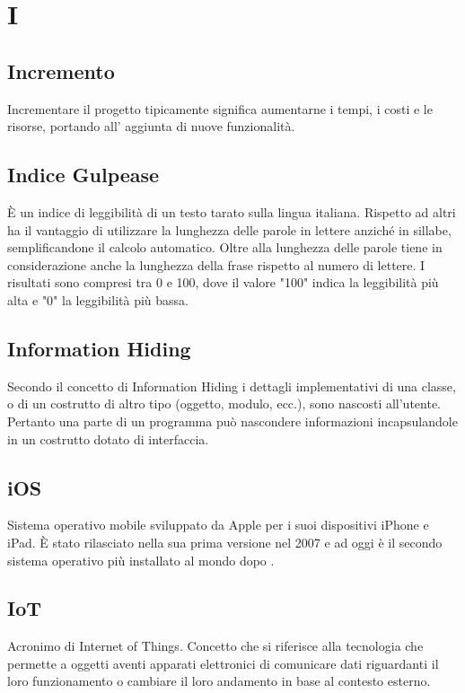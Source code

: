 \section*{I}
\markright{}
\subsection*{Incremento}
Incrementare il progetto tipicamente significa aumentarne i tempi, i costi e le risorse, portando all' aggiunta di nuove funzionalità.

\subsection*{Indice Gulpease}
È un indice di leggibilità di un testo tarato sulla lingua italiana. Rispetto ad altri ha il vantaggio di utilizzare la lunghezza delle parole in lettere anziché in sillabe, semplificandone il calcolo automatico. Oltre alla lunghezza delle parole tiene in considerazione anche la lunghezza della frase rispetto al numero di lettere. I risultati sono compresi tra 0 e 100, dove il valore "100" indica la leggibilità più alta e "0" la leggibilità più bassa.

\subsection*{Information Hiding}
Secondo il concetto di Information Hiding i dettagli implementativi di una classe, o di un costrutto di altro tipo (oggetto, modulo, ecc.), sono nascosti all'utente. Pertanto una parte di un programma può nascondere informazioni incapsulandole in un costrutto dotato di interfaccia.

\subsection*{iOS}
Sistema operativo mobile sviluppato da Apple per i suoi dispositivi iPhone e iPad. È stato rilasciato nella sua prima versione nel 2007 e ad oggi è il secondo sistema operativo più installato al mondo dopo .

\subsection*{IoT}
Acronimo di Internet of Things. Concetto che si riferisce alla tecnologia che permette a oggetti aventi apparati elettronici di comunicare dati riguardanti il loro funzionamento o cambiare il loro andamento in base al contesto esterno. 

